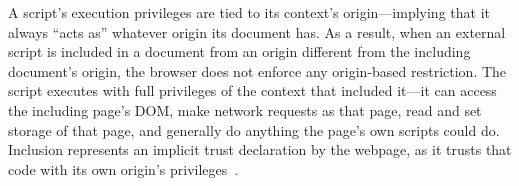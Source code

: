 

%
A script's execution privileges are tied to its context’s origin---implying that it always ``acts as'' whatever origin its document has.
%
As a result, when an external script is included in a document from an origin different from the including document's origin, the browser does not enforce any origin-based restriction.
%
The script executes with full privileges of the context that included it---it can access the including page’s DOM, make network requests as that page, read and set storage of that page, and generally do anything the page’s own scripts could do. 
%
Inclusion represents an implicit trust declaration by the webpage, as it trusts that code with its own origin’s privileges~\cite{TrackingPreventionWebKit2020}. 


